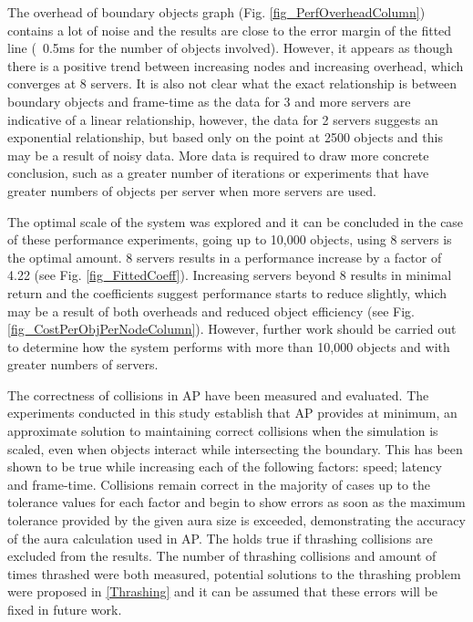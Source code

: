 The overhead of boundary objects graph (Fig. \ref{fig_PerfOverheadColumn}) contains a lot of noise and the results are close to the error margin of the fitted line (~0.5ms for the number of objects involved). However, it appears as though there is a positive trend between increasing nodes and increasing overhead, which converges at 8 servers. It is also not clear what the exact relationship is between boundary objects and frame-time as the data for 3 and more servers are indicative of a linear relationship, however, the data for 2 servers suggests an exponential relationship, but based only on the point at 2500 objects and this may be a result of noisy data. More data is required to draw more concrete conclusion, such as a greater number of iterations or experiments that have greater numbers of objects per server when more servers are used.

The optimal scale of the system was explored and it can be concluded in the case of these performance experiments, going up to 10,000 objects, using 8 servers is the optimal amount. 8 servers results in a performance increase by a factor of 4.22 (see Fig. \ref{fig_FittedCoeff}). Increasing servers beyond 8 results in minimal return and the coefficients suggest performance starts to reduce slightly, which may be a result of both overheads and reduced object efficiency (see Fig. \ref{fig_CostPerObjPerNodeColumn}). However, further work should be carried out to determine how the system performs with more than 10,000 objects and with greater numbers of servers.

The correctness of collisions in AP have been measured and evaluated. The experiments conducted in this study establish that AP provides at minimum, an approximate solution to maintaining correct collisions when the simulation is scaled, even when objects interact while intersecting the boundary. This has been shown to be true while increasing each of the following factors: speed; latency and frame-time. Collisions remain correct in the majority of cases up to the tolerance values for each factor and begin to show errors as soon as the maximum tolerance provided by the given aura size is exceeded, demonstrating the accuracy of the aura calculation used in AP. The holds true if thrashing collisions are excluded from the results. The number of thrashing collisions and amount of times thrashed were both measured, potential solutions to the thrashing problem were proposed in \ref{Thrashing} and it can be assumed that these errors will be fixed in future work.

